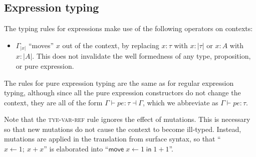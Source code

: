 \documentclass[acmsmall,nonacm]{acmart}
\newcommand{\core}[1]{\left| #1 \right|}
\newcommand{\makes}{\dashv}
\begin{document}
\subsection{Expression typing}

The typing rules for expressions make use of the following operators on contexts:

\begin{itemize}
  \item $\Gamma_{\core x}$ ``moves'' $x$ out of the context, by replacing $x:\tau$ with $x:\core\tau$ or $x:A$ with $x:\core A$. This does not invalidate the well formedness of any type, proposition, or pure expression.
\end{itemize}

The rules for pure expression typing are the same as for regular expression typing, although since all the pure expression constructors do not change the context, they are all of the form $\Gamma\vdash pe:\tau\makes \Gamma$, which we abbreviate as $\Gamma\vdash pe:\tau$.

Note that the \textsc{tye-var-ref} rule ignores the effect of mutations. This is necessary so that new mutations do not cause the context to become ill-typed. Instead, mutations are applied in the translation from surface syntax, so that ``$x\gets 1;\ x+x$'' is elaborated into ``$\mathsf{move}\;x\gets 1\;\mathsf{in}\;1+1$''.
\end{document}
